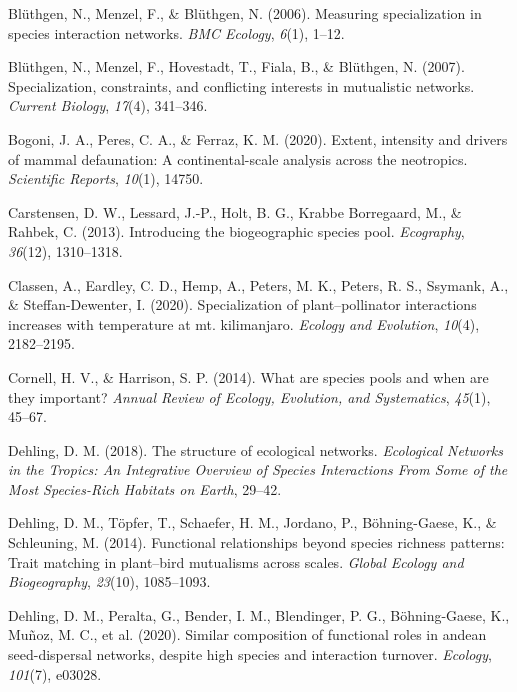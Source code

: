 \documentclass[
]{agujournal2019}
\newlength{\cslhangindent}
\newenvironment{CSLReferences}[2] %
 {\begin{list}{}{%
  \setlength{\itemindent}{0pt}
  \setlength{\leftmargin}{0pt}
  \setlength{\parsep}{0pt}
  \ifodd #1
   \setlength{\leftmargin}{\cslhangindent}
   \setlength{\itemindent}{-1\cslhangindent}
  \fi
  \setlength{\itemsep}{#2\baselineskip}}}
 {\end{list}}
\begin{document}
\begin{CSLReferences}{1}{0}
Blüthgen, N., Menzel, F., \& Blüthgen, N. (2006). Measuring
specialization in species interaction networks. \emph{BMC Ecology},
\emph{6}(1), 1--12.

Blüthgen, N., Menzel, F., Hovestadt, T., Fiala, B., \& Blüthgen, N.
(2007). Specialization, constraints, and conflicting interests in
mutualistic networks. \emph{Current Biology}, \emph{17}(4), 341--346.

Bogoni, J. A., Peres, C. A., \& Ferraz, K. M. (2020). Extent, intensity
and drivers of mammal defaunation: A continental-scale analysis across
the neotropics. \emph{Scientific Reports}, \emph{10}(1), 14750.

Carstensen, D. W., Lessard, J.-P., Holt, B. G., Krabbe Borregaard, M.,
\& Rahbek, C. (2013). Introducing the biogeographic species pool.
\emph{Ecography}, \emph{36}(12), 1310--1318.

Classen, A., Eardley, C. D., Hemp, A., Peters, M. K., Peters, R. S.,
Ssymank, A., \& Steffan-Dewenter, I. (2020). Specialization of
plant--pollinator interactions increases with temperature at mt.
kilimanjaro. \emph{Ecology and Evolution}, \emph{10}(4), 2182--2195.

Cornell, H. V., \& Harrison, S. P. (2014). What are species pools and
when are they important? \emph{Annual Review of Ecology, Evolution, and
Systematics}, \emph{45}(1), 45--67.

Dehling, D. M. (2018). The structure of ecological networks.
\emph{Ecological Networks in the Tropics: An Integrative Overview of
Species Interactions From Some of the Most Species-Rich Habitats on
Earth}, 29--42.

Dehling, D. M., Töpfer, T., Schaefer, H. M., Jordano, P., Böhning-Gaese,
K., \& Schleuning, M. (2014). Functional relationships beyond species
richness patterns: Trait matching in plant--bird mutualisms across
scales. \emph{Global Ecology and Biogeography}, \emph{23}(10),
1085--1093.

Dehling, D. M., Peralta, G., Bender, I. M., Blendinger, P. G.,
Böhning-Gaese, K., Muñoz, M. C., et al. (2020). Similar composition of
functional roles in andean seed-dispersal networks, despite high species
and interaction turnover. \emph{Ecology}, \emph{101}(7), e03028.


\end{CSLReferences}
\end{document}

